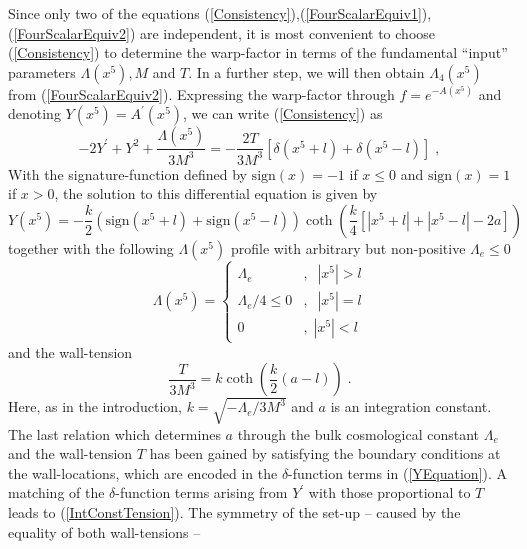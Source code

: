 \documentclass[a4paper,12pt]{article}
\begin{document}
Since only two of the equations
(\ref{Consistency}),(\ref{FourScalarEquiv1}),(\ref{FourScalarEquiv2}) are
independent, it is most convenient to choose (\ref{Consistency}) to
determine the warp-factor in terms of the fundamental ``input'' parameters
$\Lambda(x^5),M$ and $T$. In a further step, we will then obtain
$\Lambda_4(x^5)$ from (\ref{FourScalarEquiv2}). Expressing the
warp-factor through $f=e^{-A(x^5)}$ and denoting $Y(x^5)=A^\prime(x^5)$, we can
write (\ref{Consistency}) as
\begin{equation}
  -2Y^\prime+Y^2+\frac{\Lambda(x^5)}{3M^3}
 =-\frac{2T}{3M^3}\left[ \delta(x^5+l)+\delta(x^5-l) \right] \; ,
    \label{YEquation}
\end{equation}
With the signature-function
defined by $\text{sign}(x)=-1$ if $x\le 0$ and $\text{sign}(x)=1$ if $x>0$,
the solution to this differential equation is given by
\begin{equation}
  Y(x^5)= -\frac{k}{2}
      \left(\text{sign}(x^5+l)+\text{sign}(x^5-l)\right)
      \coth\left(\frac{k}{4}
                 \left[ |x^5+l| + |x^5-l| - 2a \right]
           \right)  
        \label{YSol}
\end{equation}
together with the following $\Lambda(x^5)$ profile with arbitrary but
non-positive $\Lambda_e \le 0$
\begin{equation}
  \Lambda(x^5)  = \left\{ \begin{array}{cc}
                  \Lambda_e &,\;\; |x^5| > l \\
                  \Lambda_e/4 \le 0&,\;\; |x^5| = l \\
                      0  &,\; |x^5| < l
                          \end{array}
                   \right.
   \label{CosmStep}
\end{equation}
and the wall-tension
\begin{equation}
  \frac{T}{3M^3} = k\coth\left(\frac{k}{2}(a-l)\right) \; .
   \label{IntConstTension}
\end{equation}
Here, as in the introduction, $k=\sqrt{-\Lambda_e/3M^3}$ and $a$ is an
integration constant. The last
relation which determines $a$ through the bulk
cosmological constant $\Lambda_e$ and the wall-tension $T$ has been gained by
satisfying the boundary conditions at the wall-locations, which are encoded in
the $\delta$-function terms in (\ref{YEquation}). A matching of the
$\delta$-function terms arising from $Y^\prime$ with those proportional to $T$
leads to (\ref{IntConstTension}).
The symmetry of the set-up -- caused by the equality of both wall-tensions --
\end{document}
